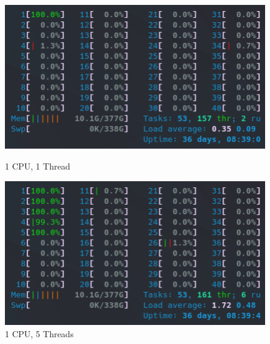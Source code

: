 \begin{figure}[!h]
    \centering
    \captionsetup{width=.48\linewidth}
    \begin{minipage}[t]{0.48\textwidth}
        \includegraphics[width=\textwidth]{figures/configurations/OMP/htop_cpus/1CPU_1Thread.png}
        \caption{1 CPU, 1 Thread}\label{fig:1CPU_1Thread}
    \end{minipage}
    \hspace{0.4cm}
    \centering
    \captionsetup{width=.48\linewidth}
    \begin{minipage}[t]{0.48\textwidth}
        \includegraphics[width=\textwidth]{figures/configurations/OMP/htop_cpus/1CPU_5Threads.png}
        \caption{1 CPU, 5 Threads}\label{fig:1CPU_5Threads}
    \end{minipage}


\end{figure}
